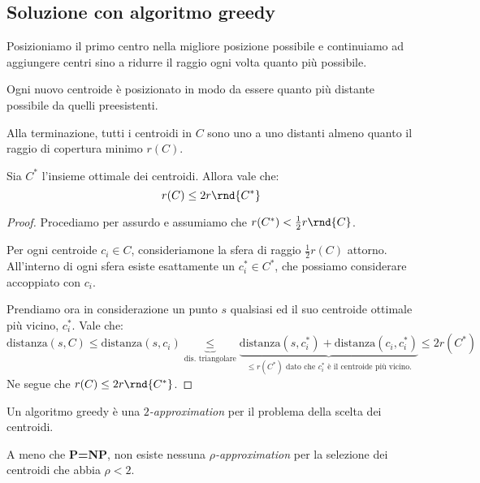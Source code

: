 \documentclass[\main/main.tex]{subfiles}
\begin{document}
\subsection{Soluzione con algoritmo greedy}
Posizioniamo il primo centro nella migliore posizione possibile e continuiamo ad aggiungere centri sino a ridurre il raggio ogni volta quanto più possibile.

Ogni nuovo centroide è posizionato in modo da essere quanto più distante possibile da quelli preesistenti.

\begin{property}
	Alla terminazione, tutti i centroidi in \(C\) sono uno a uno distanti almeno quanto il raggio di copertura minimo \(r(C)\).
\end{property}

\begin{lemma}
	Sia \(C^*\) l'insieme ottimale dei centroidi. Allora vale che:
	\[
		r(C) \leq 2r\rnd{C^*}
	\]
\end{lemma}
\begin{proof}
	Procediamo per assurdo e assumiamo che \(r(C^*) < \frac{1}{2}r\rnd{C}\).

	Per ogni centroide \(c_i \in C\), consideriamone la sfera di raggio \(\frac{1}{2} r(C)\) attorno. All'interno di ogni sfera esiste esattamente un \(c_i^* \in C^*\), che possiamo considerare accoppiato con \(c_i\).

	Prendiamo ora in considerazione un punto \(s\) qualsiasi ed il suo centroide ottimale più vicino, \(c_i^*\). Vale che:
	\[
		\text{distanza}(s, C) \leq \text{distanza}(s, c_i) \underbrace{\leq}_{\text{dis. triangolare}} \underbrace{\text{distanza}(s, c_i^*) + \text{distanza}(c_i, c_i^*)}_{\leq r(C^*) \text{ dato che \(c_i^*\) è il centroide più vicino.}} \leq 2r(C^*)
	\]
	Ne segue che \(r(C) \leq 2r\rnd{C^*}\).
\end{proof}
\begin{theorem}
	Un algoritmo greedy è una \textit{\(2\)-approximation} per il problema della scelta dei centroidi.
\end{theorem}
\begin{theorem}
	A meno che \textbf{P=NP}, non esiste nessuna \textit{\(\rho\)-approximation} per la selezione dei centroidi che abbia \(\rho<2\).
\end{theorem}
\end{document}
